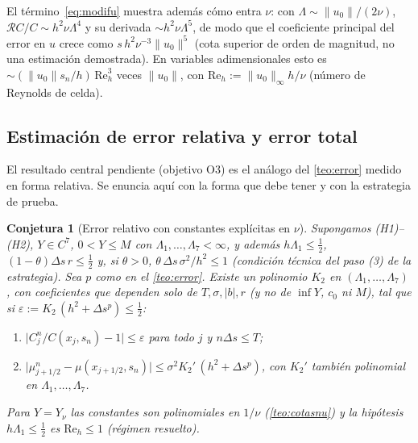 \documentclass[11pt,letterpaper]{article}
\theoremstyle{plain}
\newtheorem{conjecture}[theorem]{Conjetura}
\theoremstyle{definition}
\theoremstyle{remark}
\numberwithin{equation}{section}
\newcommand{\Reh}{\mathrm{Re}_h}
\begin{document}
	El término~\eqref{eq:modifu} muestra además cómo entra \(\nu\): con \(\Lambda\sim\|u_0\|/(2\nu)\), \(\mathcal RC/C\sim h^2\nu\Lambda^4\) y su derivada \(\sim h^2\nu\Lambda^5\), de modo que el coeficiente principal del error en \(u\) crece como \(s\,h^2\nu^{-3}\|u_0\|^5\) (cota superior de orden de magnitud, no una estimación demostrada). En variables adimensionales esto es \(\sim(\|u_0\|s_n/h)\,\Reh^3\) veces \(\|u_0\|\), con \(\Reh:=\|u_0\|_\infty h/\nu\) (número de Reynolds de celda).
	
	\subsection{Estimación de error relativa y error total}\label{subsec:O3}
	
	El resultado central pendiente (objetivo O3) es el análogo del \cref{teo:error} medido en forma relativa. Se enuncia aquí con la forma que debe tener y con la estrategia de prueba.
	
	\begin{conjecture}[Error relativo con constantes explícitas en \(\nu\)]\label{conj:O3}
		Supongamos (H1)--(H2), \(Y\in C^7\), \(0<Y\le M\) con \(\Lambda_1,\dots,\Lambda_7<\infty\), y además \(h\Lambda_1\le\frac12\), \((1-\theta)\Delta s\,r\le\frac12\) y, si \(\theta>0\), \(\theta\,\Delta s\,\sigma^2/h^2\le1\) (condición técnica del paso (3) de la estrategia). Sea \(p\) como en el \cref{teo:error}. Existe un polinomio \(K_2\) en \((\Lambda_1,\dots,\Lambda_7)\), con coeficientes que dependen solo de \(T,\sigma,|b|,r\) (y no de \(\inf Y\), \(c_0\) ni \(M\)), tal que si \(\varepsilon:=K_2\,(h^2+\Delta s^p)\le\frac12\):
		\begin{enumerate}[label=(\roman*)]
			\item \(\bigl|C^n_j/C(x_j,s_n)-1\bigr|\le\varepsilon\) para todo \(j\) y \(n\Delta s\le T\);
			\item \(\bigl|\mu^n_{j+1/2}-\mu(x_{j+1/2},s_n)\bigr|\le\sigma^2K_2'\,(h^2+\Delta s^p)\), con \(K_2'\) también polinomial en \(\Lambda_1,\dots,\Lambda_7\).
		\end{enumerate}
		Para \(Y=Y_\nu\) las constantes son polinomiales en \(1/\nu\) (\cref{teo:cotasnu}) y la hipótesis \(h\Lambda_1\le\frac12\) es \(\Reh\le1\) (régimen \emph{resuelto}).
	\end{conjecture}
	
\end{document}
